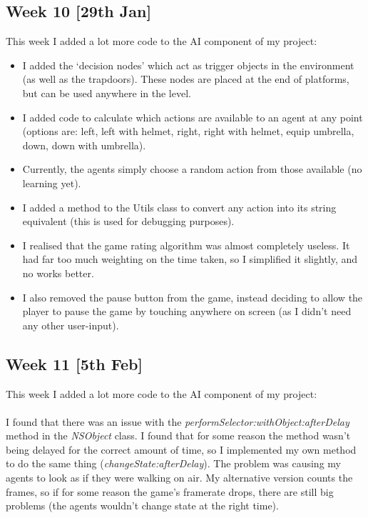 \documentclass[a4paper,oneside]{report}
\begin{document}
\subsection{Week 10 [29th Jan]}

This week I added a lot more code to the AI component of my project:

\begin{itemize} 

\item I added the `decision nodes' which act as trigger objects in the environment (as well as the trapdoors). These nodes are placed at the end of platforms, but can be used anywhere in the level.

\item I added code to calculate which actions are available to an agent at any point (options are: left, left with helmet, right, right with helmet, equip umbrella, down, down with umbrella).

\item Currently, the agents simply choose a random action from those available (no learning yet).

\item I added a method to the Utils class to convert any action into its string equivalent (this is used for debugging purposes).

\item I realised that the game rating algorithm was almost completely useless. It had far too much weighting on the time taken, so I simplified it slightly, and no works better.

\item I also removed the pause button from the game, instead deciding to allow the player to pause the game by touching anywhere on screen (as I didn't need any other user-input).

\end{itemize}



\subsection{Week 11 [5th Feb]}

This week I added a lot more code to the AI component of my project:

\paragraph{} I found that there was an issue with the \emph{performSelector:withObject:afterDelay} method in the \emph{NSObject} class. I found that for some reason the method wasn't being delayed for the correct amount of time, so I implemented my own method to do the same thing (\emph{changeState:afterDelay}). The problem was causing my agents to look as if they were walking on air. My alternative version counts the frames, so if for some reason the game's framerate drops, there are still big problems (the agents wouldn't change state at the right time).
\end{document}
